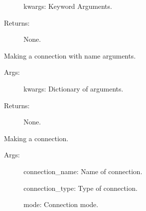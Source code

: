 \documentclass[letterpaper,10pt,english]{sphinxmanual}
\begin{document}
\begin{fulllineitems}
\begin{fulllineitems}
\begin{description}
\sphinxAtStartPar
kwargs:   Keyword Arguments.

\item[{Returns:}] \leavevmode
\sphinxAtStartPar
None.

\end{description}

\end{fulllineitems}


\begin{fulllineitems}
\label{\detokenize{QConnectionLibrary:QConnectionLibrary.connection_manager.ConnectionManager.connect_named_args}}
\sphinxAtStartPar
Making a connection with name arguments.
\begin{description}
\item[{Args:}] \leavevmode
\sphinxAtStartPar
kwargs: Dictionary of arguments.

\item[{Returns:}] \leavevmode
\sphinxAtStartPar
None.

\end{description}

\end{fulllineitems}


\begin{fulllineitems}
\label{\detokenize{QConnectionLibrary:QConnectionLibrary.connection_manager.ConnectionManager.connect_unnamed_args}}
\sphinxAtStartPar
Making a connection.
\begin{description}
\item[{Args:}] \leavevmode
\sphinxAtStartPar
connection\_name: Name of connection.

\sphinxAtStartPar
connection\_type: Type of connection.

\sphinxAtStartPar
mode: Connection mode.


\end{description}
\end{fulllineitems}
\end{fulllineitems}
\end{document}
